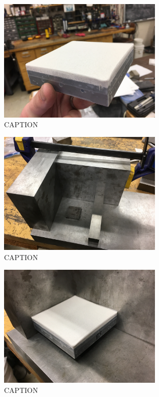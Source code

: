 \begin{figure}
	\centering
        \includegraphics[width=0.7\textwidth]{appendix_sample_prep/dds_finished_sideblock.jpg}
   	\caption{CAPTION}
  	\label{Fig:dds_finished_sideblock}
\end{figure}

\begin{figure}
	\centering
        \includegraphics[width=0.7\textwidth]{appendix_sample_prep/dds_ell_jig.jpg}
   	\caption{CAPTION}
  	\label{Fig:dds_ell_jig}
\end{figure}

\begin{figure}
	\centering
        \includegraphics[width=0.7\textwidth]{appendix_sample_prep/dds_sideblock_jig.jpg}
   	\caption{CAPTION}
  	\label{Fig:dds_sideblock_jig}
\end{figure}

